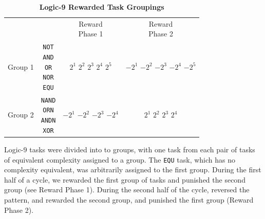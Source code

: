 \documentclass[PhD]{msu-thesis}
\begin{document}
	\begin{table}[]
	\centering
	\caption{\textbf{Logic-9 Rewarded Task Groupings}}
	\label{hgt-treatments-logic9-h}

	\begin{tabular}{|c|c|c|c|}
	\hline
	 & \thead{Tasks} & \thead{Reward \\ Phase 1} & \thead{Reward \\ Phase 2} \\\hhline{|=|=|=|=|}
	 Group 1 & \makecell{ \texttt{NOT} \\ \texttt{AND} \\ \texttt{OR} \\ \texttt{NOR} \\ \texttt{EQU} } & \makecell{ $2^1$ \\ $2^2$ \\ $2^3$ \\ $2^4$ \\ $2^5$ } & \makecell{ $-2^{1}$ \\ $-2^{2}$ \\ $-2^{3}$ \\ $-2^{4}$ \\ $-2^{5}$ } \\\hline
	 Group 2 & \makecell{ \texttt{NAND} \\ \texttt{ORN} \\ \texttt{ANDN} \\ \texttt{XOR} } & \makecell{ $-2^{1}$ \\ $-2^{2}$ \\ $-2^{3}$ \\ $-2^{4}$ } & \makecell{ $2^1$ \\ $2^2$ \\ $2^3$ \\ $2^4$ } \\\hline
	\end{tabular} 

	\begin{flushleft}Logic-9 tasks were divided into to groups, with one task from each pair of tasks of equivalent complexity assigned to a group. The \texttt{EQU} task, which has no complexity equivalent, was arbitrarily assigned to the first group. During the first half of a cycle, we rewarded the first group of tasks and punished the second group (see Reward Phase 1). During the second half of the cycle, reversed the pattern, and rewarded the second group, and punished the first group (Reward Phase 2).  
	\end{flushleft}
	\label{hgt-treatments-logic9}
	\end{table}
\end{document}
